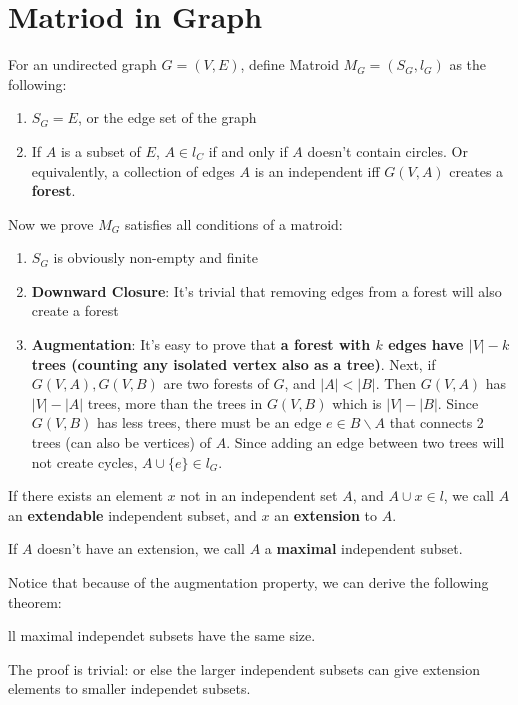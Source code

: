 \documentclass[12pt]{article}
\newenvironment{theorem}[2][Theorem]{\begin{trivlist}
		\item[\hskip \labelsep {\bfseries #1}\hskip \labelsep {\bfseries #2.}]}{\end{trivlist}}
\newenvironment{definition}[2][Definition]{\begin{trivlist}
		\item[\hskip \labelsep {\bfseries #1}\hskip \labelsep {\bfseries #2.}]}{\end{trivlist}}
\begin{document}
	\section{Matriod in Graph}
	For an undirected graph $G = (V, E)$, define Matroid $M_G = (S_G, l_G)$ as the following:
	\begin{enumerate}
		\item $S_G = E$, or the edge set of the graph
		\item If $A$ is a subset of $E$, $A \in l_C$ if and only if $A$ doesn't contain circles. Or equivalently, a collection of edges $A$ is an independent iff $G(V, A)$ creates a \textbf{forest}.
	\end{enumerate}
	Now we prove $M_G$ satisfies all conditions of a matroid:
	\begin{enumerate}
		\item $S_G$ is obviously non-empty and finite
		\item \textbf{Downward Closure}: It's trivial that removing edges from a forest will also create a forest
		\item \textbf{Augmentation}: It's easy to prove that \textbf{a forest with $k$ edges have $|V| - k$ trees (counting any isolated vertex also as a tree)}. Next, if $G(V, A), G(V, B)$ are two forests of $G$, and $|A| < |B|$. Then $G(V, A)$ has $|V| - |A|$ trees, more than the trees in $G(V, B)$ which is $|V| - |B|$. Since $G(V, B)$ has less trees, there must be an edge $e \in B \backslash A$ that connects 2 trees (can also be vertices) of $A$. Since adding an edge between two trees will not create cycles, $A \cup \{e\} \in l_G$.
	\end{enumerate}
	\begin{definition}{1}
		If there exists an element $x$ not in an independent set $A$, and $A \cup {x} \in l$, we call $A$ an \textbf{extendable} independent subset, and $x$ an \textbf{extension} to $A$. 
	\end{definition}
	\begin{definition}{2}
		If $A$ doesn't have an extension, we call $A$ a \textbf{maximal} independent subset.
	\end{definition}
	
	Notice that because of the augmentation property, we can derive the following theorem:
	
	\begin{theorem}
		All maximal independet subsets have the same size.
	\end{theorem}
	The proof is trivial: or else the larger independent subsets can give extension elements to  smaller independet subsets.
	
\end{document}
